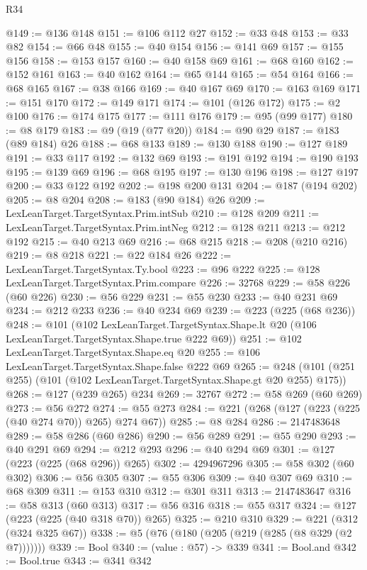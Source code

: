 \begin{lexlean}{R34}
\begin{coremodule}
@149 := @136 @148
@151 := @106 @112 @27
@152 := @33 @48
@153 := @33 @82
@154 := @66 @48
@155 := @40 @154
@156 := @141 @69
@157 := @155 @156
@158 := @153 @157
@160 := @40 @158 @69
@161 := @68 @160
@162 := @152 @161
@163 := @40 @162
@164 := @65 @144
@165 := @54 @164
@166 := @68 @165
@167 := @38 @166
@169 := @40 @167 @69
@170 := @163 @169
@171 := @151 @170
@172 := @149 @171
@174 := @101 (@126 @172)
@175 := @2 @100
@176 := @174 @175
@177 := @111 @176
@179 := @95 (@99 @177)
@180 := @8 @179
@183 := @9 (@19 (@77 @20))
@184 := @90 @29
@187 := @183 (@89 @184) @26
@188 := @68 @133
@189 := @130 @188
@190 := @127 @189
@191 := @33 @117
@192 := @132 @69
@193 := @191 @192
@194 := @190 @193
@195 := @139 @69
@196 := @68 @195
@197 := @130 @196
@198 := @127 @197
@200 := @33 @122 @192
@202 := @198 @200 @131
@204 := @187 (@194 @202)
@205 := @8 @204
@208 := @183 (@90 @184) @26
@209 := LexLeanTarget.TargetSyntax.Prim.intSub
@210 := @128 @209
@211 := LexLeanTarget.TargetSyntax.Prim.intNeg
@212 := @128 @211
@213 := @212 @192
@215 := @40 @213 @69
@216 := @68 @215
@218 := @208 (@210 @216)
@219 := @8 @218
@221 := @22 @184 @26
@222 := LexLeanTarget.TargetSyntax.Ty.bool
@223 := @96 @222
@225 := @128 LexLeanTarget.TargetSyntax.Prim.compare
@226 := 32768
@229 := @58 @226 (@60 @226)
@230 := @56 @229
@231 := @55 @230
@233 := @40 @231 @69
@234 := @212 @233
@236 := @40 @234 @69
@239 := @223 (@225 (@68 @236))
@248 := @101
    (@102
      LexLeanTarget.TargetSyntax.Shape.lt
      @20
      (@106 LexLeanTarget.TargetSyntax.Shape.true @222 @69))
@251 := @102 LexLeanTarget.TargetSyntax.Shape.eq @20
@255 := @106 LexLeanTarget.TargetSyntax.Shape.false @222 @69
@265 := @248 (@101 (@251 @255) (@101 (@102 LexLeanTarget.TargetSyntax.Shape.gt @20 @255) @175))
@268 := @127 (@239 @265) @234
@269 := 32767
@272 := @58 @269 (@60 @269)
@273 := @56 @272
@274 := @55 @273
@284 := @221 (@268 (@127 (@223 (@225 (@40 @274 @70)) @265) @274 @67))
@285 := @8 @284
@286 := 2147483648
@289 := @58 @286 (@60 @286)
@290 := @56 @289
@291 := @55 @290
@293 := @40 @291 @69
@294 := @212 @293
@296 := @40 @294 @69
@301 := @127 (@223 (@225 (@68 @296)) @265)
@302 := 4294967296
@305 := @58 @302 (@60 @302)
@306 := @56 @305
@307 := @55 @306
@309 := @40 @307 @69
@310 := @68 @309
@311 := @153 @310
@312 := @301 @311
@313 := 2147483647
@316 := @58 @313 (@60 @313)
@317 := @56 @316
@318 := @55 @317
@324 := @127 (@223 (@225 (@40 @318 @70)) @265)
@325 := @210 @310
@329 := @221 (@312 (@324 @325 @67))
@338 := @5 (@76 (@180 (@205 (@219 (@285 (@8 @329 (@2 @7)))))))
@339 := Bool
@340 := (value : @57) -> @339
@341 := Bool.and
@342 := Bool.true
@343 := @341 @342

\end{coremodule}
\end{lexlean}
